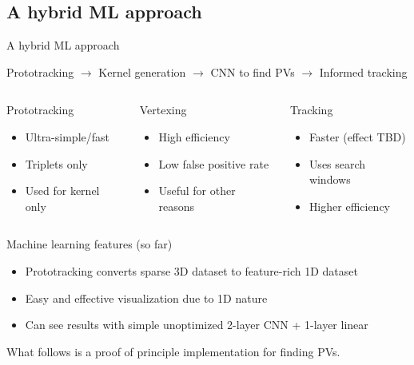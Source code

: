\subsection{A hybrid ML approach}
\begin{frame}{A hybrid ML approach}
\begin{center}
Prototracking $\rightarrow$ Kernel generation $\rightarrow$ CNN to find PVs $\rightarrow$ Informed tracking
\end{center}

\begin{columns}[b]
    \begin{block}{Prototracking}
    \begin{itemize}
        \item Ultra-simple/fast
        \item Triplets only
        \item Used for kernel only
        \end{itemize}
    \end{block}
    \begin{block}{Vertexing}
    \begin{itemize}
        \item High efficiency
        \item Low false positive rate
        \item Useful for other reasons
        \end{itemize}
    \end{block}
    \begin{block}{Tracking}
    \begin{itemize}
        \item Faster (effect TBD)
        \item Uses search windows
        \item Higher efficiency
    \end{itemize}
    \end{block}
\end{columns}
    \begin{block}{Machine learning features (so far)}
        \begin{itemize}
            \item Prototracking converts sparse 3D dataset to feature-rich 1D dataset
            \item Easy and effective visualization due to 1D nature
            \item Can see results with simple unoptimized 2-layer CNN + 1-layer linear
        \end{itemize}
    \end{block}

\vspace{.3em}
\begin{center}
What follows is a proof of principle implementation for finding PVs.
\end{center}
\end{frame}

